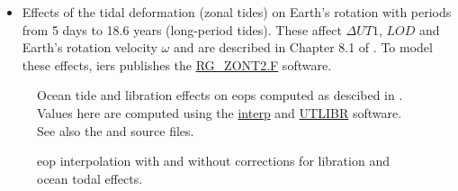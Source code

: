 \begin{itemize}
\begin{itemize}
    \end{itemize}

    \item Effects of the tidal deformation (zonal tides) on Earth’s rotation with 
      periods from 5 days to 18.6 years (long-period tides). These affect 
      $\Delta UT1$, $LOD$ and Earth's rotation velocity $\omega$ and are 
      described in Chapter 8.1 of \cite{iers2010}. To model these effects, \gls{iers} 
      publishes the \href{https://iers-conventions.obspm.fr/content/chapter8/software/RG_ZONT2.F}{RG\_ZONT2.F} 
      software.

\end{itemize}

\begin{figure}
  \centering
  
  \caption{Ocean tide and libration effects on \glspl{eop} computed as descibed in \cite{iers2010}. 
    Values here are computed using the \protect\href{https://hpiers.obspm.fr/iers/models/interp.f}{interp} and 
    \protect\href{https://iers-conventions.obspm.fr/content/chapter5/software/UTLIBR.F}{UTLIBR} software. 
    See also the  and  
    source files.}
  \label{fig:eop-variations}
\end{figure}

\begin{figure}
  \centering
  
  \caption{\gls{eop} interpolation with and without corrections for libration and ocean todal effects.}
  \label{fig:eop-interpolation}
\end{figure}


